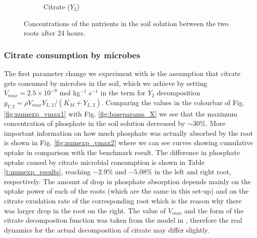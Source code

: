 \documentclass[11pt]{article}
\numberwithin{equation}{section}
\begin{document}
\begin{figure}[!htb]
\begin{subfigure}[t]{0.3\textwidth}
    \caption{Citrate ($Y_2$)}
\end{subfigure}
\caption{Concentrations of the nutrients in the soil solution between the two roots after 24 hours.}
\label{fig:baseparams}
\end{figure}

\subsubsection{Citrate consumption by microbes}
\label{sec:numexp_vmax}
The first parameter change we experiment with is the assumption that citrate gets consumed by microbes in the soil, which we achieve by setting $V_{max} = 2.5 \times 10^{-9}$ mol kg$^{-1}$ s$^{-1}$ in the term for $Y_2$ decomposition $g_{Y,2} = \rho V_{max} Y_{L,2}/(K_M+Y_{L,2})$. Comparing the values in the colourbar of Fig. \ref{fig:numexp_vmax1} with Fig. \ref{fig:baseparams_X} we see that the maximum concentration of phosphate in the soil solution decreased by $\sim 30\%$. More important information on how much phosphate was actually absorbed by the root is shown in Fig. \ref{fig:numexp_vmax2} where we can see curves showing cumulative uptake in comparison with the benchmark result. The difference in phosphate uptake caused by citrate microbial consumption is shown in Table \ref{t:numexp_results}, reaching $-2.9\%$ and $-5.08\%$ in the left and right root, respectively. The amount of drop in phosphate absorption depends mainly on the uptake power of each of the roots (which are the same in this set-up) and on the citrate exudation rate of the corresponding root which is the reason why there was larger drop in the root on the right. The value of $V_{max}$ and the form of the citrate decompositon function was taken from the  model in \cite{Ptashnyk-2011}, therefore the real dynamics for the actual decomposition of citrate may differ slightly.
\end{document}
